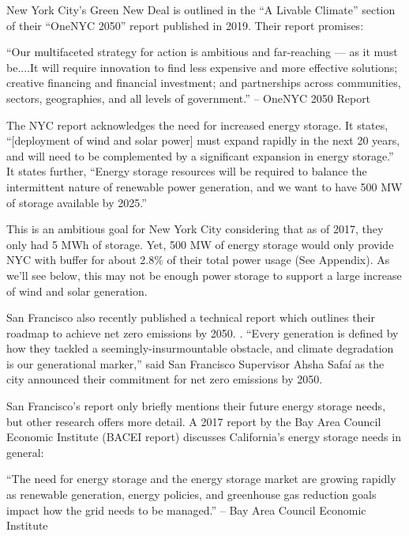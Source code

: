 \documentclass[hidelinks,12pt,a4paper]{article}
\begin{document}
New York City's Green New Deal is outlined in the “A Livable Climate” section of their “OneNYC 2050” report published in 2019. Their report promises:

\begin{displayquote}
“Our multifaceted strategy for action is ambitious and far-reaching — as it must be....It will require innovation to find less expensive and more effective solutions; creative financing and financial investment; and partnerships across communities, sectors, geographies, and all levels of government.” \cite{OneNYC2050FullReport} -- OneNYC 2050 Report
\end{displayquote}

The NYC report acknowledges the need for increased energy storage. It states, “[deployment of wind and solar power] must expand rapidly in the next 20 years, and will need to be complemented by a significant expansion in energy storage.” \cite{OneNYC2050FullReport} It states further, “Energy storage resources will be required to balance the intermittent nature of renewable power generation, and we want to have 500 MW of storage available by 2025.”

This is an ambitious goal for New York City considering that as of 2017, they only had 5 MWh of storage\cite{NYEnergyStorageTargetTheJourneyNotTheDestination}. Yet, 500 MW of energy storage would only provide NYC with buffer for about 2.8\% of their total power usage (See Appendix). As we'll see below, this may not be enough power storage to support a large increase of wind and solar generation.

San Francisco also recently published a technical report which outlines their roadmap to achieve net zero emissions by 2050. \cite{Focus2030APathwaytoNetZeroEmissions}. “Every generation is defined by how they tackled a seemingly-insurmountable obstacle, and climate degradation is our generational marker,” said San Francisco Supervisor Ahsha Safaí as the city announced their commitment for net zero emissions by 2050.\cite{SanFranciscoMayor100PercentRenewableElectricity}

San Francisco's report only briefly mentions their future energy storage needs, but other research offers more detail. A 2017 report by the Bay Area Council Economic Institute (BACEI report) discusses California's energy storage needs in general:

\begin{displayquote}
“The need for energy storage and the energy storage market are growing rapidly as renewable generation, energy policies, and greenhouse gas reduction goals impact how the grid needs to be managed.”\cite{EnergyStorageCaliforniaClimateandEnergyGoals} --  Bay Area Council Economic Institute
\end{displayquote}
\end{document}
